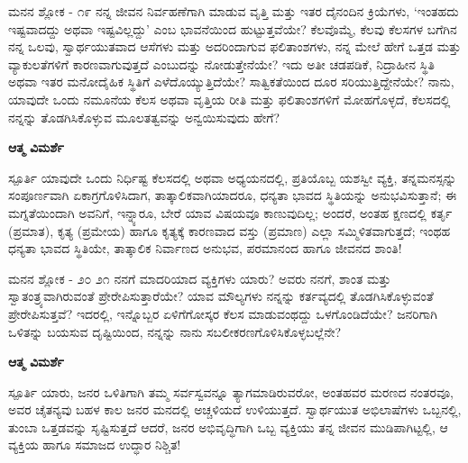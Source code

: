 \begin{mananam}{\mananamfont \large ಮನನ ಶ್ಲೋಕ - ೧೯}
\mananamtext ನನ್ನ ಜೀವನ ನಿರ್ವಹಣೆಗಾಗಿ ಮಾಡುವ ವೃತ್ತಿ ಮತ್ತು ಇತರ ದೈನಂದಿನ ಕ್ರಿಯೆಗಳು, ‘ಇಂತಹದು ಇಷ್ಟವಾದದ್ದು ಅಥವಾ ಇಷ್ಟವಿಲ್ಲದ್ದು’ ಎಂಬ ಭಾವನೆಯಿಂದ ಹುಟ್ಟುತ್ತವೆಯೇ? ಕೆಲವೊಮ್ಮೆ, ಕೆಲವು ಕೆಲಸಗಳ ಬಗೆಗಿನ ನನ್ನ ಒಲವು, ಸ್ವಾರ್ಥಯುತವಾದ ಆಸೆಗಳು ಮತ್ತು ಅದರಿಂದಾಗುವ ಫಲಿತಾಂಶಗಳು, ನನ್ನ ಮೇಲೆ  ಹೇಗೆ ಒತ್ತಡ ಮತ್ತು ವ್ಯಾಕುಲತೆಗಳಿಗೆ ಕಾರಣವಾಗುವುತ್ತದೆ ಎಂಬುದನ್ನು ನೋಡುತ್ತೇನೆಯೇ? ಇದು ಅತೀ ಚಡಪಡಿಕೆ, ನಿದ್ರಾಹೀನ ಸ್ಥಿತಿ ಅಥವಾ ಇತರ ಮನೋದೈಹಿಕ ಸ್ಥಿತಿಗೆ ಎಳೆದೊಯ್ಯುತ್ತಿದೆಯೇ? ಸಾತ್ವಿಕತೆಯಿಂದ ದೂರ ಸರಿಯುತ್ತಿದ್ದೇನೆಯೇ? ನಾನು, ಯಾವುದೇ ಒಂದು ನಮೂನೆಯ ಕೆಲಸ ಅಥವಾ ವೃತ್ತಿಯ ರೀತಿ ಮತ್ತು ಫಲಿತಾಂಶಗಳಿಗೆ ಮೋಹಗೊಳ್ಳದೆ, ಕೆಲಸದಲ್ಲಿ ನನ್ನನ್ನು ತೊಡಗಿಸಿಕೊಳ್ಳುವ ಮೂಲತತ್ವವನ್ನು ಅನ್ವಯಿಸುವುದು ಹೇಗೆ? 
\end{mananam}
\WritingHand\enspace\textbf{ಆತ್ಮ ವಿಮರ್ಶೆ}\\
\begin{inspiration}{\mananamfont \large ಸ್ಪೂರ್ತಿ}
\mananamtext ಯಾವುದೇ ಒಂದು ನಿರ್ಧಿಷ್ಟ ಕೆಲಸದಲ್ಲಿ ಅಥವಾ ಅಧ್ಯಯನದಲ್ಲಿ, ಪ್ರತಿಯೊಬ್ಬ ಯಶಸ್ವೀ ವ್ಯಕ್ತಿ, ತನ್ನಮನಸ್ಸನ್ನು ಸಂಪೂರ್ಣವಾಗಿ ಏಕಾಗ್ರಗೊಳಿಸಿದಾಗ, ತಾತ್ಕಾಲಿಕವಾಗಿಯಾದರೂ, ಧನ್ಯತಾ ಭಾವದ ಸ್ಥಿತಿಯನ್ನು ಅನುಭವಿಸುತ್ತಾನೆ; ಈ ಮಗ್ನತೆಯಿಂದಾಗಿ ಅವನಿಗೆ, ಇನ್ನ್ಯಾರೂ, ಬೇರೆ ಯಾವ ವಿಷಯವೂ ಕಾಣುವುದಿಲ್ಲ; ಅಂದರೆ, ಅಂತಹ ಕ್ಷಣದಲ್ಲಿ ಕರ್ತೃ (ಪ್ರಮಾತ), ಕೃತ್ಯ (ಪ್ರಮೇಯ) ಹಾಗೂ ಕೃತ್ಯಕ್ಕೆ ಕಾರಣವಾದ ವಸ್ತು (ಪ್ರಮಾಣ) ಎಲ್ಲಾ ಸಮ್ಮಿಳಿತವಾಗುತ್ತದೆ; ಇಂಥಹ ಧನ್ಯತಾ ಭಾವದ ಸ್ಥಿತಿಯೇ, ತಾತ್ಕಾಲಿಕ ನಿರ್ವಾಣದ ಅನುಭವ, ಪರಮಾನಂದ ಹಾಗೂ ಜೀವನದ ಶಾಂತಿ! 
\end{inspiration}
\newpage

\begin{mananam}{\mananamfont \large ಮನನ ಶ್ಲೋಕ - ೨೦ ೨೧}
\mananamtext ನನಗೆ ಮಾದರಿಯಾದ ವ್ಯಕ್ತಿಗಳು ಯಾರು? ಅವರು ನನಗೆ, ಶಾಂತ ಮತ್ತು ಸ್ವಾತಂತ್ರ್ಯವಾಗಿರುವಂತೆ ಪ್ರೇರೇಪಿಸುತ್ತಾರೆಯೇ? ಯಾವ ಮೌಲ್ಯಗಳು ನನ್ನನ್ನು ಕರ್ತವ್ಯದಲ್ಲಿ ತೊಡಗಿಸಿಕೊಳ್ಳುವಂತೆ ಪ್ರೇರೇಪಿಸುತ್ತವೆ? ಇದರಲ್ಲಿ,  ಇನ್ನೊಬ್ಬರ ಏಳಿಗೆಗೋಸ್ಕರ ಕೆಲಸ ಮಾಡುವಂಥದ್ದು ಒಳಗೊಂಡಿದೆಯೇ? ಜನರಿಗಾಗಿ ಒಳಿತನ್ನು ಬಯಸುವ ದೃಷ್ಟಿಯಿಂದ, ನನ್ನನ್ನು ನಾನು ಸಬಲೀಕರಣಗೊಳಿಸಿಕೊಳ್ಳಬಲ್ಲೆನೇ? 
\end{mananam}
\WritingHand\enspace\textbf{ಆತ್ಮ ವಿಮರ್ಶೆ}\\
\begin{inspiration}{\mananamfont \large ಸ್ಪೂರ್ತಿ}
\mananamtext ಯಾರು, ಜನರ ಒಳಿತಿಗಾಗಿ ತಮ್ಮ ಸರ್ವಸ್ವವನ್ನೂ ತ್ಯಾಗಮಾಡಿರುವರೋ, ಅಂತಹವರ ಮರಣದ ನಂತರವೂ, ಅವರ ಚೈತನ್ಯವು ಬಹಳ ಕಾಲ ಜನರ ಮನದಲ್ಲಿ ಅಚ್ಚಳಿಯದೆ ಉಳಿಯುತ್ತದೆ. ಸ್ವಾರ್ಥಯುತ ಅಭಿಲಾಷೆಗಳು ಒಬ್ಬನಲ್ಲಿ, ತುಂಬಾ ಒತ್ತಡವನ್ನು ಸೃಷ್ಟಿಸುತ್ತದೆ ಆದರೆ, ಜನರ ಅಭಿವೃದ್ಧಿಗಾಗಿ ಒಬ್ಬ ವ್ಯಕ್ತಿಯು ತನ್ನ ಜೀವನ ಮುಡಿಪಾಗಿಟ್ಟಲ್ಲಿ, ಆ ವ್ಯಕ್ತಿಯ ಹಾಗೂ ಸಮಾಜದ ಉದ್ಧಾರ ನಿಶ್ಚಿತ!
\end{inspiration}
\newpage

